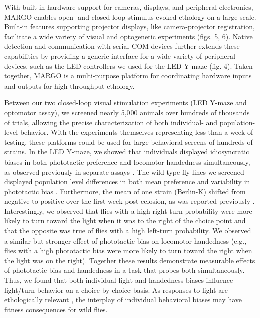 \documentclass[10pt]{article}
\begin{document}
\begin{multicols}{2}
With built-in hardware support for cameras, displays, and peripheral electronics, MARGO enables open- and closed-loop stimulus-evoked ethology on a large scale. Built-in features supporting projector displays, like camera-projector registration, facilitate a wide variety of visual and optogenetic experiments (figs. 5, 6). Native detection and communication with serial COM devices further extends these capabilities by providing a generic interface for a wide variety of peripheral devices, such as the LED controllers we used for the LED Y-maze (fig. 4). Taken together, MARGO is a multi-purpose platform for coordinating hardware inputs and outputs for high-throughput ethology. 

Between our two closed-loop visual stimulation experiments (LED Y-maze and optomotor assay), we screened nearly 5,000 animals over hundreds of thousands of trials, allowing the precise characterization of both individual- and population-level behavior. With the experiments themselves representing less than a week of testing, these platforms could be used for large behavioral screens of hundreds of strains. In the LED Y-maze, we showed that individuals displayed idiosyncratic biases in both phototactic preference and locomotor handedness simultaneously, as observed previously in separate assays \citep{Kain_Phototactic_2012,Buchanan_Neuronal_2015}. The wild-type fly lines we screened displayed population level differences in both mean preference and variability in phototactic bias \citep{Ayroles_Behavioral_2015}. Furthermore, the mean of one strain (Berlin-K) shifted from negative to positive over the first week post-eclosion, as was reported previously \citep{Chiang_Tactic_1963}. Interestingly, we observed that flies with a high right-turn probability were more likely to turn toward the light when it was to the right of the choice point and that the opposite was true of flies with a high left-turn probability. We observed a similar but stronger effect of phototactic bias on locomotor handedness (e.g., flies with a high phototactic bias were more likely to turn toward the right when the light was on the right). Together these results demonstrate measurable effects of phototactic bias and handedness in a task that probes both simultaneously. Thus, we found that both individual light and handedness biases influence light/turn behavior on a choice-by-choice basis. As responses to light are ethologically relevant \citep{Kain_Variability_2015}, the interplay of individual behavioral biases may have fitness consequences for wild flies.


\end{multicols}
\end{document}
